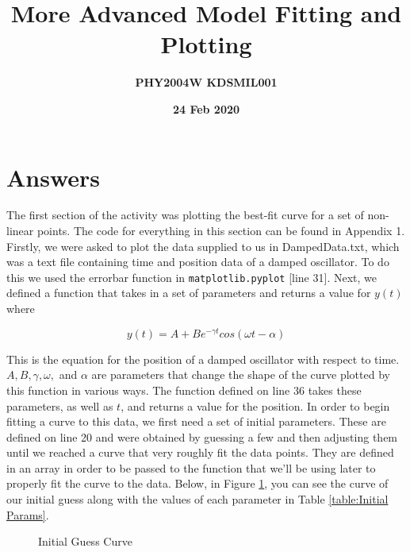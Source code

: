 \documentclass[12pt]{article}
\title{More Advanced Model Fitting and Plotting}
\author{\textbf{PHY2004W \hspace{8cm} KDSMIL001}}
\date{\textbf{24 Feb 2020}}
\begin{document}
    \begin{titlepage}
        \maketitle
        \tableofcontents
    \end{titlepage}

    \section{Answers}
    The first section of the activity was plotting the best-fit curve for a set of non-linear 
    points. The code for everything in this section can be found in Appendix 1.
    Firstly, we were asked to plot the data supplied to us in DampedData.txt, which was a text 
    file containing time and position data of a damped oscillator. To do this we used the errorbar 
    function in \texttt{matplotlib.pyplot} [line 31]. Next, we defined a function that takes in 
    a set of parameters and returns a value for $y(t)$ where

    \begin{equation}
        y(t) = A+Be^{-\gamma t}cos(\omega t-\alpha)
    \end{equation}
    
    \noindent
    This is the equation for the position of a damped oscillator with respect to time. $A, B, 
    \gamma, \omega,$ and $\alpha$ are parameters that change the shape of the curve plotted 
    by this function in various ways. The function defined on line 36 takes these parameters, 
    as well as $t$, and returns a value for the position. \newline
    In order to begin fitting a curve to this data, we first need a set of initial parameters. 
    These are defined on line 20 and were obtained by guessing a few and then adjusting them 
    until we reached a curve that very roughly fit the data points. They are defined in an array 
    in order to be passed to the function that we'll be using later to properly fit the curve 
    to the data. Below, in Figure \ref{fig:Initial Guess}, you can see the curve of our initial 
    guess along with the values of each parameter in Table \ref{table:Initial Params}.
    
    \begin{figure}[H]
        \begin{center}
           \scalebox{.8}{}
           \caption{Initial Guess Curve}
           \label{fig:Initial Guess}
        \end{center}
    \end{figure}
\end{document}
